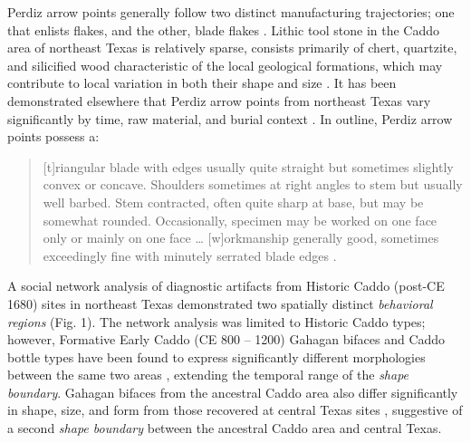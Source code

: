 \documentclass[smallextended]{svjour3}       %
\begin{document}
Perdiz arrow points generally follow two distinct manufacturing
trajectories; one that enlists flakes, and the other, blade flakes
\cite{RN8999,RN9361,RN9000,RN9364}. Lithic tool stone in the Caddo area
of northeast Texas is relatively sparse, consists primarily of chert,
quartzite, and silicified wood characteristic of the local geological
formations, which may contribute to local variation in both their shape
and size \cite{RN9364,RN439}. It has been demonstrated elsewhere that
Perdiz arrow points from northeast Texas vary significantly by time, raw
material, and burial context \cite{RN9364}. In outline, Perdiz arrow
points possess a:

\begin{quote}
{[}t{]}riangular blade with edges usually quite straight but sometimes
slightly convex or concave. Shoulders sometimes at right angles to stem
but usually well barbed. Stem contracted, often quite sharp at base, but
may be somewhat rounded. Occasionally, specimen may be worked on one
face only or mainly on one face \ldots{} {[}w{]}orkmanship generally
good, sometimes exceedingly fine with minutely serrated blade edges
\cite[504]{RN5769}.
\end{quote}

A social network analysis of diagnostic artifacts from Historic Caddo
(post-CE 1680) sites in northeast Texas demonstrated two spatially
distinct \emph{behavioral regions} \cite{RN8031} (Fig. 1). The network
analysis was limited to Historic Caddo types; however, Formative Early
Caddo (CE 800 -- 1200) Gahagan bifaces and Caddo bottle types have been
found to express significantly different morphologies between the same
two areas \cite{RN8074,RN7927,RN8370,RN8312}, extending the temporal
range of the \emph{shape boundary}. Gahagan bifaces from the ancestral
Caddo area also differ significantly in shape, size, and form from those
recovered at central Texas sites \cite{RN8322}, suggestive of a second
\emph{shape boundary} between the ancestral Caddo area and central
Texas.
\end{document}
